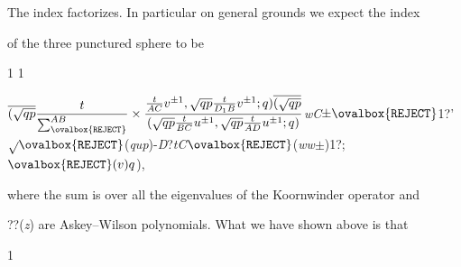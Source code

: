 \documentclass[a4paper,12pt]{article}
\begin{document}
The index factorizes. In particular on general grounds we expect the index

of the three punctured sphere to be

1 1

$\displaystyle \overline{(\sqrt{qp}}\frac{t}{\sum_{\ovalbox{\tt\small REJECT}}^{AB}}\times\frac{\frac{t}{AC}v^{\pm 1},\sqrt{qp}\frac{t}{D_{1}B}v^{\pm 1};q)\overline{(\sqrt{qp}}}{(\sqrt{qp}\frac{t}{BC}u^{\pm 1},\sqrt{qp}\frac{t}{AD}u^{\pm 1};q)}${\it wC}$\pm\ovalbox{\tt\small REJECT}$1?'$\sqrt{}\ovalbox{\tt\small REJECT}$({\it qup})-{\it D}?{\it tC}$\ovalbox{\tt\small REJECT}$({\it ww}$\pm$)1?;$\ovalbox{\tt\small REJECT}(v)q$),

where the sum is over all the eigenvalues of the Koornwinder operator and

??({\it z}) are Askey–Wilson polynomials. What we have shown above is that

1
\end{document}
